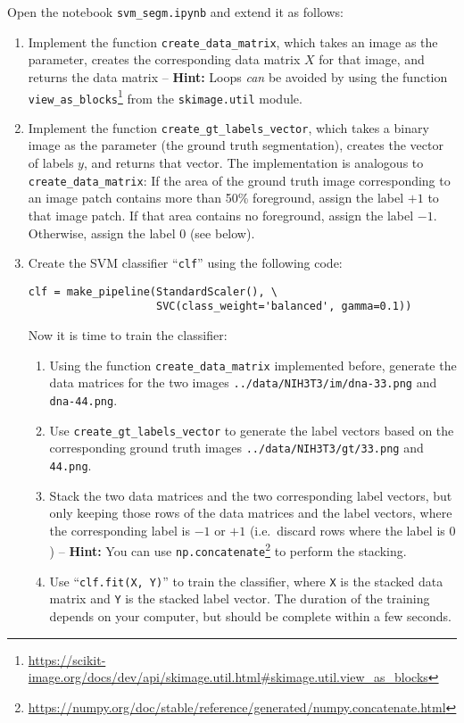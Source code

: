 \documentclass[12pt,a4paper]{article}
\begin{document}
Open the notebook \texttt{svm\_segm.ipynb} and extend it as follows:
\begin{enumerate}
    \item Implement the function \texttt{create\_data\_matrix}, which takes an image as the parameter, creates the corresponding data matrix $X$ for that image, and returns the data matrix -- \textbf{Hint:} Loops \emph{can} be avoided by using the function \texttt{view\_as\_blocks}\footnote{\mbox{\url{https://scikit-image.org/docs/dev/api/skimage.util.html\#skimage.util.view\_as\_blocks}}} from the \texttt{skimage.util} module.
    \item Implement the function \texttt{create\_gt\_labels\_vector}, which takes a binary image as the parameter (the ground truth segmentation), creates the vector of labels $y$, and returns that vector. The implementation is analogous to \texttt{create\_data\_matrix}: If the area of the ground truth image corresponding to an image patch contains more than 50\% foreground, assign the label $+1$ to that image patch. If that area contains no foreground, assign the label $-1$. Otherwise, assign the label $0$ (see below).
    \item Create the SVM classifier ``\texttt{clf}'' using the following code:
\begin{Verbatim}[frame=single]
clf = make_pipeline(StandardScaler(), \
                    SVC(class_weight='balanced', gamma=0.1))
\end{Verbatim}
    Now it is time to train the classifier:
    \begin{enumerate}
        \item Using the function \texttt{create\_data\_matrix} implemented before, generate the data matrices for the two images \texttt{../data/NIH3T3/im/dna-33.png} and \texttt{dna-44.png}.
        \item Use \texttt{create\_gt\_labels\_vector} to generate the label vectors based on the corresponding ground truth images \texttt{../data/NIH3T3/gt/33.png} and \texttt{44.png}.
        \item Stack the two data matrices and the two corresponding label vectors, but only keeping those rows of the data matrices and the label vectors, where the corresponding label is $-1$ or $+1$ (i.e.\ discard rows where the label is $0$) -- \textbf{Hint:} You can use \texttt{np.concatenate}\footnote{\mbox{\url{https://numpy.org/doc/stable/reference/generated/numpy.concatenate.html}}} to perform the stacking.
        \item Use ``\texttt{clf.fit(X, Y)}'' to train the classifier, where \texttt{X} is the stacked data matrix and \texttt{Y} is the stacked label vector. The duration of the training depends on your computer, but should be complete within a few seconds.

\end{enumerate}
\end{enumerate}
\end{document}
